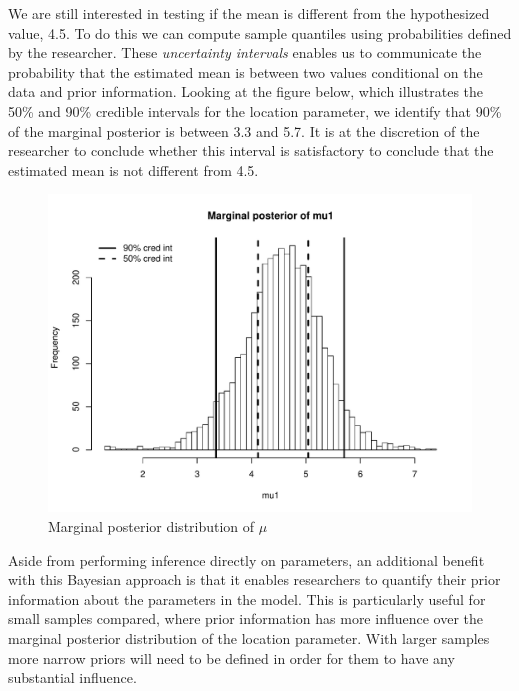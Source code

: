 \documentclass[12pt]{article}
\begin{document}
\noindent We are still interested in testing if the mean is different from the hypothesized value, 4.5. To do this we can compute sample quantiles using probabilities defined by the researcher. These \emph{uncertainty intervals} enables us to communicate the probability that the estimated mean is between two values conditional on the data and prior information. Looking at the figure below, which illustrates the 50\% and 90\% credible intervals for the location parameter, we identify that 90\% of the marginal posterior is between 3.3 and 5.7. It is at the discretion of the researcher to conclude whether this interval is satisfactory to conclude that the estimated mean is not different from 4.5. \\

\begin{figure}[H]\caption[]{Marginal posterior distribution of $\mu$}
\centering
\begin{minipage}{0.6\linewidth}
\includegraphics[trim={0cm 0cm 0cm 1.5cm}, clip, scale=0.6]{../figs/norm1.pdf}
\end{minipage}
\end{figure}

\noindent Aside from performing inference directly on parameters, an additional benefit with this Bayesian approach is that it enables researchers to quantify their prior information about the parameters in the model. This is particularly useful for small samples compared, where prior information has more influence over the marginal posterior distribution of the location parameter. With larger samples more narrow priors will need to be defined in order for them to have any substantial influence.
\end{document}
